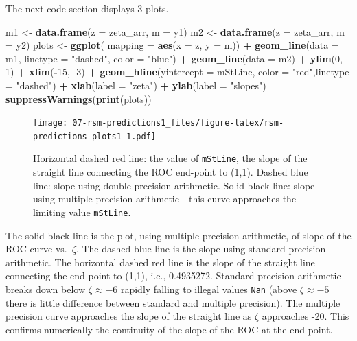 \documentclass[
]{book}
\newenvironment{Shaded}{\begin{snugshade}}{\end{snugshade}}
\newcommand{\DataTypeTok}[1]{\textcolor[rgb]{0.13,0.29,0.53}{#1}}
\newcommand{\DecValTok}[1]{\textcolor[rgb]{0.00,0.00,0.81}{#1}}
\newcommand{\KeywordTok}[1]{\textcolor[rgb]{0.13,0.29,0.53}{\textbf{#1}}}
\newcommand{\NormalTok}[1]{#1}
\newcommand{\OperatorTok}[1]{\textcolor[rgb]{0.81,0.36,0.00}{\textbf{#1}}}
\newcommand{\StringTok}[1]{\textcolor[rgb]{0.31,0.60,0.02}{#1}}
\begin{document}
The next code section displays 3 plots.

\begin{Shaded}
\begin{Highlighting}[]
\NormalTok{m1 <-}\StringTok{ }\KeywordTok{data.frame}\NormalTok{(}\DataTypeTok{z =}\NormalTok{ zeta_arr, }\DataTypeTok{m =}\NormalTok{ y1)}
\NormalTok{m2 <-}\StringTok{ }\KeywordTok{data.frame}\NormalTok{(}\DataTypeTok{z =}\NormalTok{ zeta_arr, }\DataTypeTok{m =}\NormalTok{ y2)}
\NormalTok{plots <-}\StringTok{ }\KeywordTok{ggplot}\NormalTok{(}
  \DataTypeTok{mapping =} \KeywordTok{aes}\NormalTok{(}\DataTypeTok{x =}\NormalTok{ z, }\DataTypeTok{y =}\NormalTok{ m)) }\OperatorTok{+}\StringTok{ }
\StringTok{  }\KeywordTok{geom_line}\NormalTok{(}\DataTypeTok{data =}\NormalTok{ m1, }\DataTypeTok{linetype =} \StringTok{"dashed"}\NormalTok{, }\DataTypeTok{color =} \StringTok{"blue"}\NormalTok{) }\OperatorTok{+}\StringTok{ }
\StringTok{  }\KeywordTok{geom_line}\NormalTok{(}\DataTypeTok{data =}\NormalTok{ m2) }\OperatorTok{+}
\StringTok{  }\KeywordTok{ylim}\NormalTok{(}\DecValTok{0}\NormalTok{, }\DecValTok{1}\NormalTok{) }\OperatorTok{+}\StringTok{ }\KeywordTok{xlim}\NormalTok{(}\OperatorTok{-}\DecValTok{15}\NormalTok{, }\DecValTok{-3}\NormalTok{) }\OperatorTok{+}\StringTok{ }
\StringTok{  }\KeywordTok{geom_hline}\NormalTok{(}\DataTypeTok{yintercept =}\NormalTok{ mStLine, }\DataTypeTok{color =} \StringTok{"red"}\NormalTok{,}\DataTypeTok{linetype =} \StringTok{"dashed"}\NormalTok{) }\OperatorTok{+}\StringTok{ }
\StringTok{  }\KeywordTok{xlab}\NormalTok{(}\DataTypeTok{label =} \StringTok{"zeta"}\NormalTok{) }\OperatorTok{+}\StringTok{ }\KeywordTok{ylab}\NormalTok{(}\DataTypeTok{label =} \StringTok{"slopes"}\NormalTok{)}
\KeywordTok{suppressWarnings}\NormalTok{(}\KeywordTok{print}\NormalTok{(plots))}
\end{Highlighting}
\end{Shaded}

\begin{figure}
\centering
\texttt{[image: 07-rsm-predictions1\_files/figure-latex/rsm-predictions-plots1-1.pdf]}
\caption{\label{fig:rsm-predictions-plots1}Horizontal dashed red line: the value of \texttt{mStLine}, the slope of the straight line connecting the ROC end-point to (1,1). Dashed blue line: slope using double precision arithmetic. Solid black line: slope using multiple precision arithmetic - this curve approaches the limiting value \texttt{mStLine}.}
\end{figure}

The solid black line is the plot, using multiple precision arithmetic, of slope of the ROC curve vs.~\(\zeta\). The dashed blue line is the slope using standard precision arithmetic. The horizontal dashed red line is the slope of the straight line connecting the end-point to (1,1), i.e., 0.4935272. Standard precision arithmetic breaks down below \(\zeta \approx -6\) rapidly falling to illegal values \texttt{Nan} (above \(\zeta \approx -5\) there is little difference between standard and multiple precision). The multiple precision curve approaches the slope of the straight line as \(\zeta\) approaches -20. This confirms numerically the continuity of the slope of the ROC at the end-point.
\end{document}
